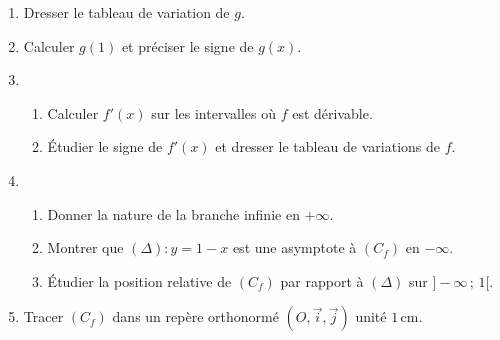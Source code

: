 \documentclass[12pt,a4paper]{article}
\begin{document}
\begin{multicols}{2}
\begin{enumerate}
    \item Dresser le tableau de variation de \( g \).
    
    \item Calculer \( g(1) \) et préciser le signe de \( g(x) \).
    
    \item
    \begin{enumerate}
        \item Calculer \( f'(x) \) sur les intervalles où \( f \) est dérivable.
        
        \item Étudier le signe de \( f'(x) \) et dresser le tableau de variations de \( f \).
    \end{enumerate}
    
    \item
    \begin{enumerate}
        \item Donner la nature de la branche infinie en \( +\infty \).
        
        \item Montrer que \( (\Delta) : y = 1 - x \) est une asymptote à \( (C_f) \) en \( -\infty \).
        
        \item Étudier la position relative de \( (C_f) \) par rapport à \( (\Delta) \) sur \( ] -\infty\,;\,1[ \).
    \end{enumerate}
    
    \item Tracer \( (C_f) \) dans un repère orthonormé \( (O,\vec{i},\vec{j}) \) unité \( 1\,\text{cm} \).
\end{enumerate}
\end{multicols}
\end{document}
